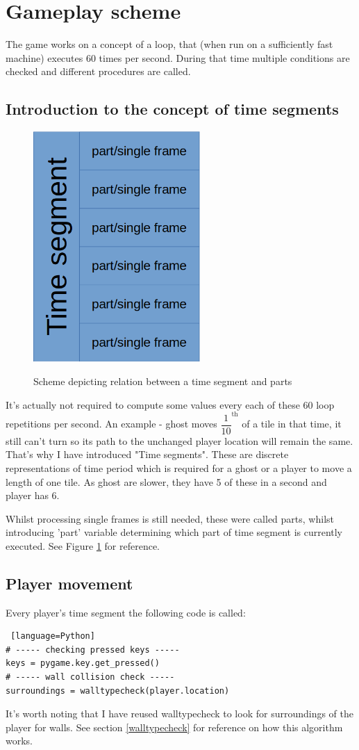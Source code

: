 \documentclass[11pt,a4paper,notitlepage]{report}
\newcommand{\dsubsection}[1]{\FloatBarrier \subsection{#1}}
\newenvironment{img}{
	\begin{center}
		\begin{figure}[H]
			\begin{center}
			
}{
	\end{center}
		\end{figure}
			\end{center}
}
\begin{document}
		\section{Gameplay scheme}
			The game works on a concept of a loop, that (when run on a sufficiently fast machine) executes 60 times per second. During that time multiple  conditions are checked and different procedures are called.
			\dsubsection{Introduction to the concept of time segments}
				\label{timesegments}
				\begin{img}
					\includegraphics[width=180pt]{images/segment-part-relation}\\
					\caption{Scheme depicting relation between a time segment and parts}
					\label{segment-part-relation}
				\end{img}
				It's actually not required to compute some values every each of these 60 loop repetitions per second. An example - ghost moves $\dfrac{1}{10}^{\text{th}}$ of a tile in that time, it still can't turn so its path to the unchanged player location will remain the same. That's why I have introduced "Time segments". These are discrete representations of time period which is required for a ghost or a player to move a length of one tile. As ghost are slower, they have 5 of these in a second and player has 6. 
				\label{part_definition}
				
				Whilst processing single frames is still needed, these were called parts, whilst introducing 'part' variable determining which part of time segment is currently executed. See Figure \ref{segment-part-relation} for reference.
			\dsubsection{Player movement}
				Every player's time segment the following code is called:
				\begin{lstlisting} [language=Python]
# ----- checking pressed keys -----
keys = pygame.key.get_pressed()
# ----- wall collision check -----
surroundings = walltypecheck(player.location)
				\end{lstlisting}
				It's worth noting that I have reused walltypecheck to look for surroundings of the player for walls. See section \ref{walltypecheck} for reference on how this algorithm works.
				
\end{document}
